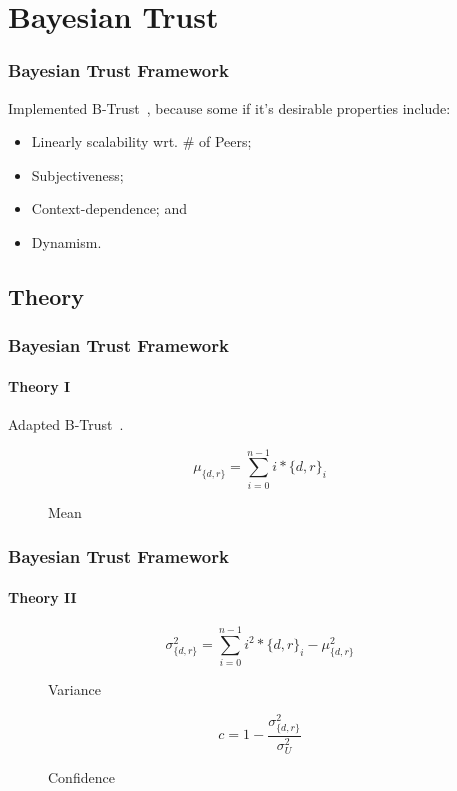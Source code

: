 \section{Bayesian Trust}
\begin{frame}
\frametitle{Bayesian Trust Framework}

Implemented B-Trust~\citep*{btrust}, because some if it's desirable properties
include:
\begin{itemize}
  \item Linearly scalability wrt. \# of Peers;
  \item Subjectiveness;
  \item Context-dependence; and
  \item Dynamism.
\end{itemize}

\end{frame}


\subsection{Theory}
\begin{frame}
\frametitle{Bayesian Trust Framework}
\framesubtitle{Theory I}

Adapted B-Trust~\citep*{btrust}.

\begin{figure}
\begin{equation}
\mu_{\{d,r\}} = \sum_{i=0}^{n-1}{i*{\{d,r\}}_i}
\end{equation}
\caption{Mean}
\end{figure}

\end{frame}


\begin{frame}
\frametitle{Bayesian Trust Framework}
\framesubtitle{Theory II}

\begin{figure}
\begin{equation}
\sigma^2_{\{d,r\}} = \sum_{i=0}^{n-1}{i^2*{\{d,r\}}_i} - \mu^2_{\{d,r\}}
\end{equation}
\caption{Variance}
\end{figure}

\begin{figure}
\begin{equation}
c = 1 - \frac{\sigma^2_{\{d,r\}}}{\sigma^2_U}
\end{equation}
\caption{Confidence}
\end{figure}

\end{frame}


